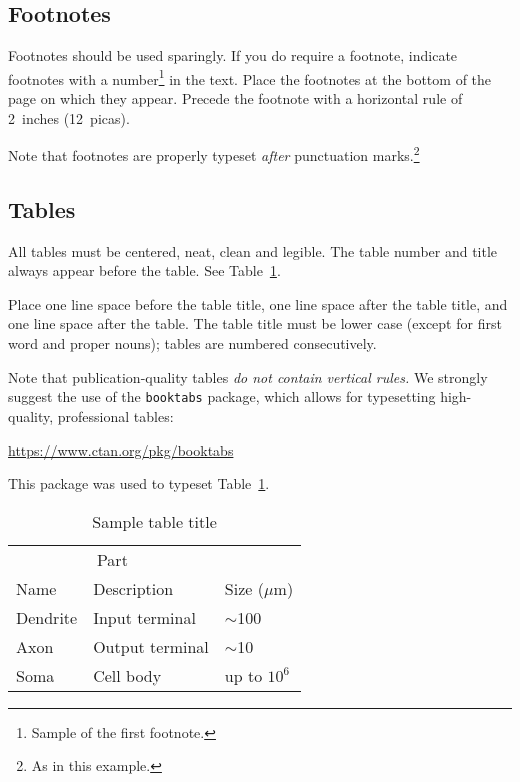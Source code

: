 \documentclass{article}
\begin{document}
\subsection{Footnotes}

Footnotes should be used sparingly.  If you do require a footnote,
indicate footnotes with a number\footnote{Sample of the first
  footnote.} in the text. Place the footnotes at the bottom of the
page on which they appear.  Precede the footnote with a horizontal
rule of 2~inches (12~picas).

Note that footnotes are properly typeset \emph{after} punctuation
marks.\footnote{As in this example.}

\subsection{Tables}

All tables must be centered, neat, clean and legible.  The table
number and title always appear before the table.  See
Table~\ref{sample-table}.

Place one line space before the table title, one line space after the
table title, and one line space after the table. The table title must
be lower case (except for first word and proper nouns); tables are
numbered consecutively.

Note that publication-quality tables \emph{do not contain vertical
  rules.} We strongly suggest the use of the \verb+booktabs+ package,
which allows for typesetting high-quality, professional tables:
\begin{center}
  \url{https://www.ctan.org/pkg/booktabs}
\end{center}
This package was used to typeset Table~\ref{sample-table}.

\begin{table}[t]
  \caption{Sample table title}
  \label{sample-table}
  \centering
  \begin{tabular}{lll}
    \toprule
    \multicolumn{2}{c}{Part}                   \\
    \cmidrule{1-2}
    Name     & Description     & Size ($\mu$m) \\
    \midrule
    Dendrite & Input terminal  & $\sim$100     \\
    Axon     & Output terminal & $\sim$10      \\
    Soma     & Cell body       & up to $10^6$  \\
    \bottomrule
  \end{tabular}
\end{table}
\end{document}
